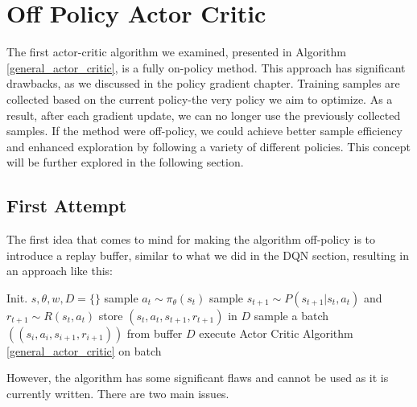 \section{Off Policy Actor Critic}
The first actor-critic algorithm we examined, presented in Algorithm \ref{general_actor_critic},
is a fully on-policy method. This approach has significant drawbacks, as we discussed in the policy
gradient chapter. Training samples are collected based on the current policy-the very policy we aim
to optimize. As a result, after each gradient update, we can no longer use the previously collected
samples. If the method were off-policy, we could achieve better sample efficiency and enhanced
exploration by following a variety of different policies. This concept will be further explored in the 
following section.
\subsection{First Attempt}
The first idea that comes to mind for making the algorithm off-policy is to introduce a replay buffer,
similar to what we did in the DQN section, resulting in an approach like this:
\begin{algorithm}[H]
  \large
    \caption{}\label{first_off_policy_attempt_act_crit}
    \begin{algorithmic}
        \STATE Init. $s,\theta,w, D = \{\}$
        \STATE sample $a_t \sim \pi_{\theta}(s_t)$
        \STATE sample $s_{t+1} \sim P(s_{t+1}|s_t,a_t)$ and  $r_{t+1} \sim R(s_t,a_t)$
        \STATE store $(s_t,a_t,s_{t+1},r_{t+1})$ in $D$
        \STATE sample a batch $((s_i,a_i,s_{i+1},r_{i+1}))$ from buffer $D$
        \STATE execute Actor Critic Algorithm \ref{general_actor_critic} on batch
        \ENDFOR
    \end{algorithmic}
\end{algorithm}
However, the algorithm has some significant flaws and cannot be used as it is currently written. There are two 
main issues. 
